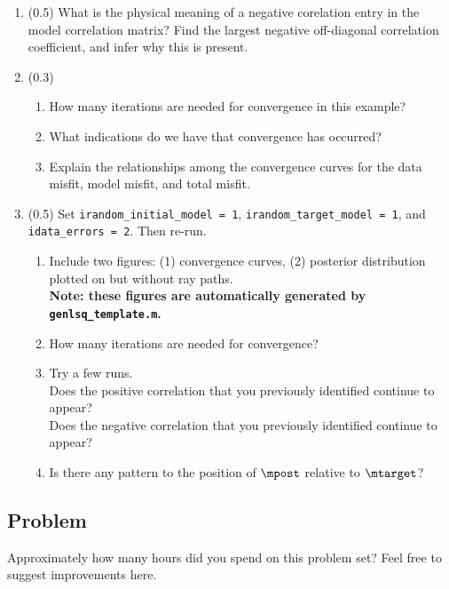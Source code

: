 \documentclass[11pt,titlepage,fleqn]{article}
\begin{document}
\begin{enumerate}

\item (0.5) What is the physical meaning of a negative corelation entry in the model correlation matrix? Find the largest negative off-diagonal correlation coefficient, and infer why this is present.


\item (0.3)
%
\begin{enumerate}
\item How many iterations are needed for convergence in this example?
\item What indications do we have that convergence has occurred?
\item Explain the relationships among the convergence curves for the data misfit, model misfit, and total misfit.
\end{enumerate}


\item (0.5) Set \verb+irandom_initial_model = 1+, \verb+irandom_target_model = 1+, and \verb+idata_errors = 2+. Then re-run.
%
\begin{enumerate}
\item Include two figures: (1) convergence curves, (2) posterior distribution plotted on  but without ray paths. \\
{\bf Note: these figures are automatically generated by \verb+genlsq_template.m+.}
\item How many iterations are needed for convergence?
\item Try a few runs. \\
Does the positive correlation that you previously identified continue to appear? \\
Does the negative correlation that you previously identified continue to appear?
\item Is there any pattern to the position of $\mpost$ relative to $\mtarget$?
\end{enumerate}

\end{enumerate}


\subsection*{Problem}

Approximately how many hours did you spend on this problem set? Feel free to suggest improvements here.

\pagebreak



\end{document}

